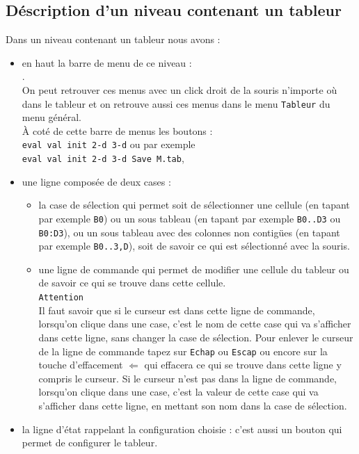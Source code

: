 \documentclass[a4paper,11pt]{book}
\begin{document}
\subsection{D\'escription d'un niveau contenant un tableur}
Dans un niveau contenant un tableur nous avons :
\begin{itemize}
\item en haut la barre de menu  de ce niveau :\\
.\\
On peut retrouver ces menus avec un click droit de la souris n'importe o\`u
dans le tableur et on retrouve aussi ces menus dans le  
menu {\tt Tableur} du menu g\'en\'eral.\\ 
\`A cot\'e de cette barre de menus les boutons :\\
{\tt eval val init 2-d 3-d} ou par exemple\\
{\tt eval val init 2-d 3-d  Save M.tab},
\item une ligne compos\'ee de deux cases :
\begin{itemize}
\item la case de s\'election qui permet soit de s\'electionner une cellule (en 
tapant par exemple {\tt B0}) ou un sous tableau (en tapant par exemple 
{\tt B0..D3} ou {\tt B0:D3}), ou un sous tableau avec des colonnes non 
contig\"ues (en tapant par exemple {\tt B0..3,D}), soit de savoir ce qui est 
s\'electionn\'e avec la souris. 
\item une ligne de commande qui permet de modifier une cellule du tableur ou 
de savoir ce qui se trouve dans cette cellule. \\
{\tt Attention}\\
Il faut savoir que si le curseur est dans cette ligne de commande, lorsqu'on 
clique dans une case, c'est le nom de cette case qui va s'afficher dans cette 
ligne, sans changer la case de s\'election. Pour enlever le curseur de la ligne
de commande tapez sur {\tt Echap} ou {\tt Escap} ou encore sur la touche 
d'effacement $\Leftarrow$ qui effacera ce qui se trouve dans cette
ligne y compris le curseur.
Si le curseur n'est pas dans la ligne de commande, lorsqu'on clique dans une 
case, c'est la valeur de cette case qui va s'afficher dans cette ligne, en
mettant son nom dans la case de s\'election. 
\end{itemize}
\item la ligne d'\'etat rappelant la configuration choisie : c'est aussi un 
bouton qui permet de configurer le tableur.\\

\end{itemize}
\end{document}
